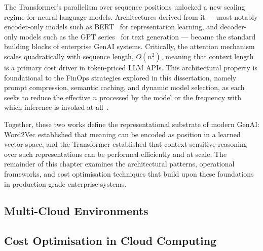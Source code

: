 The Transformer's parallelism over sequence positions unlocked a new scaling
regime for neural language models. Architectures derived from it --- most
notably encoder-only models such as BERT~\cite{devlin2018bert} for
representation learning, and decoder-only models such as the GPT
series~\cite{brown2020gpt3} for text generation --- became the standard
building blocks of enterprise GenAI systems. Critically, the attention
mechanism scales quadratically with sequence length, \(O(n^2)\), meaning
that context length is a primary cost driver in token-priced LLM APIs.
This architectural property is foundational to the FinOps strategies
explored in this dissertation, namely prompt compression, semantic caching,
and dynamic model selection, as each seeks to reduce the effective \(n\)
processed by the model or the frequency with which inference is invoked at
all~\cite{mikolov2013word2vec,vaswani2017attention}.

Together, these two works define the representational substrate of modern
GenAI: Word2Vec established that meaning can be encoded as position in a
learned vector space, and the Transformer established that context-sensitive
reasoning over such representations can be performed efficiently and at scale.
The remainder of this chapter examines the architectural patterns, operational
frameworks, and cost optimisation techniques that build upon these foundations
in production-grade enterprise systems.

\subsection{Multi-Cloud Environments}
\label{sec:multicloud}



\subsection{Cost Optimisation in Cloud Computing}
\label{sec:cost-opt}



